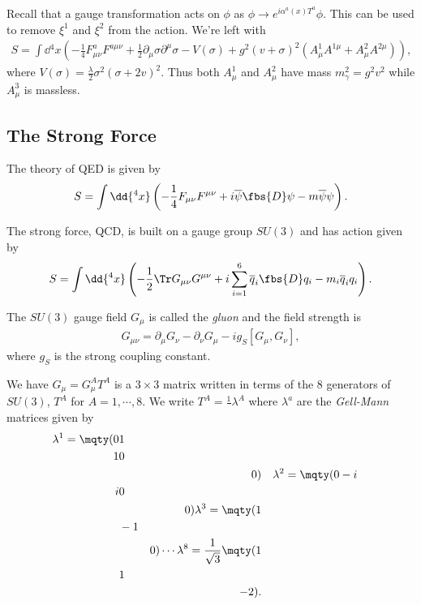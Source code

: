 Recall that a gauge transformation acts on $\phi$ as $\phi \to e^{i\alpha^{a}\left( x \right) T^{a}} \phi$. This can be used to remove $\xi^{1}$ and $\xi^{2}$ from the action. We're left with 
\begin{align}
    S = \int \dd{^{4}x} \left( -\frac{1}{4} F_{\mu \nu}^{a} F^{a \mu \nu} + \frac{1}{2} \partial_\mu \sigma \partial^{\mu} \sigma - V\left( \sigma \right) + g^2 \left( v + \sigma \right)^2 \left( A^{1}_\mu A^{1\mu} + A^2_\mu A^{2\mu} \right)  \right) 
,\end{align}
where $V\left( \sigma \right) = \frac{\lambda}{2}\sigma^2 \left( \sigma + 2 v \right)^2$. Thus both $A^{1}_\mu$ and $A^2_\mu$ have mass $m^2_\gamma = g^2 v^2$ while $A_\mu^3$ is massless.


\subsection{The Strong Force}

The theory of QED is given by
\begin{align}
    S = \int \dd{^{4}x} \left( -\frac{1}{4} F_{\mu \nu} F^{\mu \nu} + i \overline{\psi} \fbs{D} \psi - m \overline{\psi}\psi \right)
.\end{align}

The strong force, QCD, is built on a gauge group $SU \left( 3 \right) $ and has action given by
\begin{align}
    S = \int \dd{^{4}x} \left( -\frac{1}{2} \Tr G_{\mu \nu} G^{\mu \nu} + i \sum_{i=1}^{6} \overline{q}_i \fbs{D} q_i - m_i \overline{q}_i q_i \right)
.\end{align}

The $SU\left( 3 \right) $ gauge field $G_\mu$ is called the \emph{gluon} and the field strength is
\begin{align}
    G_{\mu \nu} = \partial_\mu G_\nu - \partial_\nu G_\mu - ig_S \left[ G_\mu, G_\nu \right] 
,\end{align}
where $g_S$ is the strong coupling constant.

We have $G_\mu = G_\mu^{A} T^{A}$ is a $3 \times 3$ matrix written in terms of the 8 generators of $SU \left( 3 \right) $, $T^{A}$ for $A = 1, \cdots, 8$. We write $T^{A} = \frac{1}{} \lambda^{A}$ where $\lambda^{a}$ are the \emph{Gell-Mann} matrices given by
\begin{align}
    \lambda^{1} = \mqty( 0 & 1 & \\ 1 & 0 \\ & & 0 ) && \lambda^2 = \mqty( 0 & -i \\ i & 0 & \\ & & 0 ) \lambda^3 = \mqty( 1 & & \\ & -1 & \\ & & 0 ) \cdots \lambda^{8} = \frac{1}{\sqrt{3} }\mqty( 1 & & \\ & 1 & \\ & & -2 )
.\end{align}

